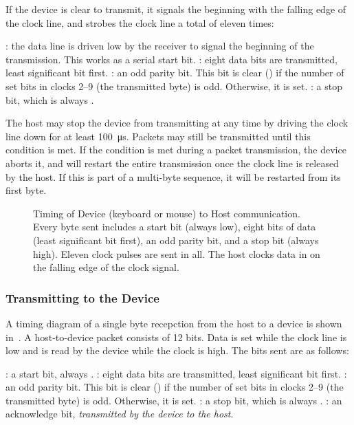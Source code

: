 If the device is clear to transmit, it signals the beginning with the falling
edge of the clock line, and strobes the clock line a total of eleven times:

\begin{description}
: the data line is driven low by the receiver to signal the
beginning of the transmission. This works as a serial start bit.  : eight data bits are transmitted, least significant bit first.
: an odd parity bit. This bit is clear () if the number of
set bits in clocks 2–9 (the transmitted byte) is odd. Otherwise, it is set.
: a stop bit, which is always .
\end{description}

The host may stop the device from transmitting at any time by driving the clock
line down for at least 100~μs. Packets may still be transmitted until this
condition is met. If the condition is met during a packet transmission, the
device aborts it, and will restart the entire transmission once the clock line
is released by the host. If this is part of a multi-byte sequence, it will be
restarted from its first byte.

\begin{figure*}
\centering
{}
\caption[Keyboard/Mouse to Host Communication]{\label{fig:kbd-kbd-to-host}
  Timing of Device (keyboard or mouse) to Host communication. Every byte sent
  includes a start bit (always low), eight bits of data (least significant bit
  first), an odd parity bit, and a stop bit (always high). Eleven clock pulses
  are sent in all. The host clocks data in on the falling edge of the clock
  signal.}
\end{figure*}



\subsubsection{Transmitting to the Device}

A timing diagram of a single byte recepction from the host to a device is shown
in~. A host-to-device packet consists of 12 bits. Data
is set while the clock line is low and is read by the device while the clock
is high. The bits sent are as follows:

\begin{description}
: a start bit, always .
: eight data bits are transmitted, least significant bit first.
: an odd parity bit. This bit is clear () if the number of
set bits in clocks 2–9 (the transmitted byte) is odd. Otherwise, it is set.
: a stop bit, which is always .
: an acknowledge bit, {\em transmitted by the device to the host}.
\end{description}

